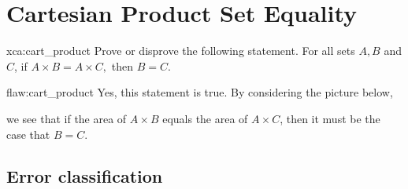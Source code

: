 \section{Cartesian Product Set Equality}

\begin{xca}{xca:cart_product}
Prove or disprove the following statement. For all sets $A,B$ and $C$, if $A \times B = A \times C,$ then $B=C.$ 
\end{xca}

\begin{flaw}{flaw:cart_product} %
Yes, this statement is true. By considering the picture below,

we see that if the area of $A \times B$ equals the area of $A \times C$, then it must be the case that $B=C.$

\end{flaw}

\clearpage
\subsection{Error classification}

